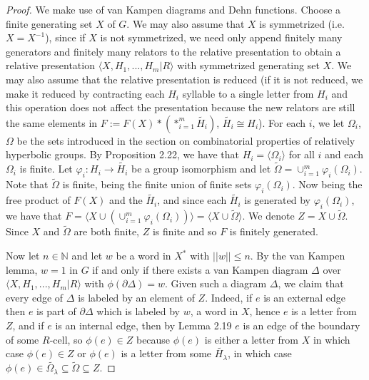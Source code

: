 \documentclass[12pt]{article}
\newcommand{\vs}{\vskip10pt}
\begin{document}
	\begin{proof}
		
		We make use of van Kampen diagrams and Dehn functions. Choose a finite generating set $X$ of $G$. We may also assume that $X$ is symmetrized (i.e. $X = X^{-1}$), since if $X$ is not symmetrized, we need only append finitely many generators and finitely many relators to the relative presentation to obtain a relative presentation $\langle X, H_1,...,H_m \vert R \rangle$ with symmetrized generating set $X$. We may also assume that the relative presentation is reduced (if it is not reduced, we make it reduced by contracting each $H_i$ syllable to a single letter from $H_i$ and this operation does not affect the presentation because the new relators are still the same elements in $F := F(X) * (*_{i=1}^m \tilde{H_i})$, $\tilde{H_i} \cong H_i$). For each $i$, we let $\Omega_i$, $\Omega$ be the sets introduced in the section on combinatorial properties of relatively hyperbolic groups. By Proposition 2.22, we have that $H_i = \langle \Omega_i \rangle$ for all $i$ and each $\Omega_i$ is finite. Let $\varphi_i : H_i \rightarrow \tilde{H_i}$ be a group isomorphism and let $\tilde{\Omega} = \cup_{i=1}^m \varphi_i(\Omega_i)$. Note that $\tilde{\Omega}$ is finite, being the finite union of finite sets $\varphi_i(\Omega_i)$. Now being the free product of $F(X)$ and the $\tilde{H_i}$, and since each $\tilde{H_i}$ is generated by $\varphi_i(\Omega_i)$, we have that $F = \langle X \cup (\cup_{i=1}^m \varphi_i(\Omega_i)) \rangle = \langle X \cup \tilde{\Omega} \rangle$. We denote $Z = X \cup \tilde{\Omega}$. Since $X$ and $\tilde{\Omega}$ are both finite, $Z$ is finite and so $F$ is finitely generated. 
		
		\vs 
		
		Now let $n \in \mathbb{N}$ and let $w$ be a word in $X^*$ with $\vert \vert w \vert \vert \leq n$. By the van Kampen lemma, $w = 1$ in $G$ if and only if there exists a van Kampen diagram $\Delta$ over $\langle X, H_1,...,H_m \vert R \rangle$ with $\phi(\partial \Delta) = w$. Given such a diagram $\Delta$, we claim that every edge of $\Delta$ is labeled by an element of $Z$. Indeed, if $e$ is an external edge then $e$ is part of $\partial \Delta$ which is labeled by $w$, a word in $X$, hence $e$ is a letter from $Z$, and if $e$ is an internal edge, then by Lemma 2.19 $e$ is an edge of the boundary of some $R$-cell, so $\phi(e) \in Z$ because $\phi(e)$ is either a letter from $X$ in which case $\phi(e) \in Z$ or $\phi(e)$ is a letter from some $\tilde{H_\lambda}$, in which case $\phi(e) \in \tilde{\Omega_\lambda} \subseteq \tilde{\Omega} \subseteq Z$. 
		

\end{proof}
\end{document}
